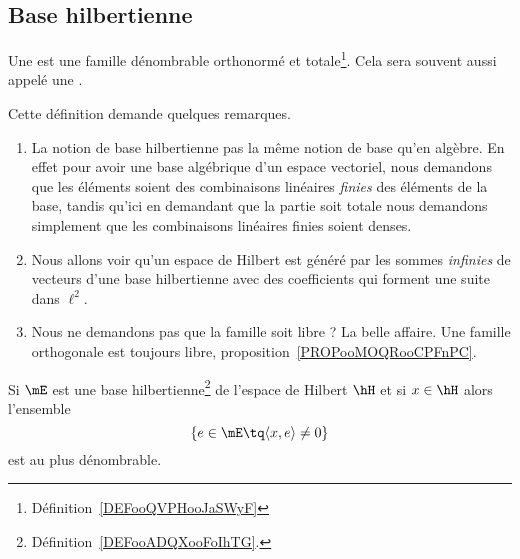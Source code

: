 \subsection{Base hilbertienne}

\begin{definition}      \label{DEFooADQXooFoIhTG}
    Une  est une famille dénombrable orthonormé et totale\footnote{Définition~\ref{DEFooQVPHooJaSWyF}}. Cela sera souvent aussi appelé une .
\end{definition}

\begin{normaltext}
    Cette définition demande quelques remarques.

    \begin{enumerate}
        \item
            La notion de base hilbertienne pas la même notion de base qu'en algèbre. En effet pour avoir une base algébrique d'un espace vectoriel, nous demandons que les éléments soient des combinaisons linéaires \emph{finies} des éléments de la base, tandis qu'ici en demandant que la partie soit totale nous demandons simplement que les combinaisons linéaires finies soient denses.
        \item
            Nous allons voir qu'un espace de Hilbert est généré par les sommes \emph{infinies} de vecteurs d'une base hilbertienne avec des coefficients qui forment une suite dans \( \ell^2\).
        \item
            Nous ne demandons pas que la famille soit libre ? La belle affaire. Une famille orthogonale est toujours libre, proposition~\ref{PROPooMOQRooCPFnPC}.
    \end{enumerate}
\end{normaltext}

\begin{lemma}       \label{LEMooHWOBooQJKdTD}
    Si \( \mE\) est une base hilbertienne\footnote{Définition~\ref{DEFooADQXooFoIhTG}.} de l'espace de Hilbert \( \hH\) et si \( x\in \hH\) alors l'ensemble
    \begin{equation}
        \{ e\in\mE\tq \langle x, e\rangle \neq 0 \}
    \end{equation}
    est au plus dénombrable.
\end{lemma}

